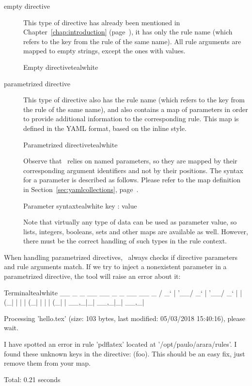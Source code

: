 \begin{description}
\item[empty directive] This type of directive has already been mentioned in Chapter~\ref{chap:introduction} (page~\pageref{chap:introduction}), it has only the rule name (which refers to the  key from the rule of the same name). All rule arguments are mapped to empty strings, except the ones with  values.

\begin{codebox}{Empty directive}{teal}{\icnote}{white}
\end{codebox}

\item[parametrized directive] This type of directive also has the rule name (which refers to the  key from the rule of the same name), and also contains a map of parameters in order to provide additional information to the corresponding rule. This map is defined in the YAML format, based on the inline style.

\begin{codebox}{Parametrized directive}{teal}{\icnote}{white}
\end{codebox}

Observe that \arara\ relies on named parameters, so they are mapped by their corresponding argument identifiers and not by their positions. The syntax for a parameter is described as follows. Please refer to the map definition in Section~\ref{sec:yamlcollections}, page~\pageref{sec:yamlcollections}.

\begin{codebox}{Parameter syntax}{teal}{\icnote}{white}
key : value
\end{codebox}

Note that virtually any type of data can be used as parameter value, so lists, integers, booleans, sets and other maps are available as well. However, there must be the correct handling of such types in the rule context.
\end{description}

When handling parametrized directives, \arara\ always checks if directive parameters and rule arguments match. If we try to inject a nonexistent parameter in a parametrized directive, the tool will raise an error about it:

\begin{codebox}{Terminal}{teal}{\icnote}{white}
  __ _ _ __ __ _ _ __ __ _ 
 / _` | '__/ _` | '__/ _` |
| (_| | | | (_| | | | (_| |
 \__,_|_|  \__,_|_|  \__,_|

Processing 'hello.tex' (size: 103 bytes, last modified:
05/03/2018 15:40:16), please wait.

I have spotted an error in rule 'pdflatex' located at
'/opt/paulo/arara/rules'. I found these unknown keys
in the directive: (foo). This should be an easy fix,
just remove them from your map.

Total: 0.21 seconds
\end{codebox}

